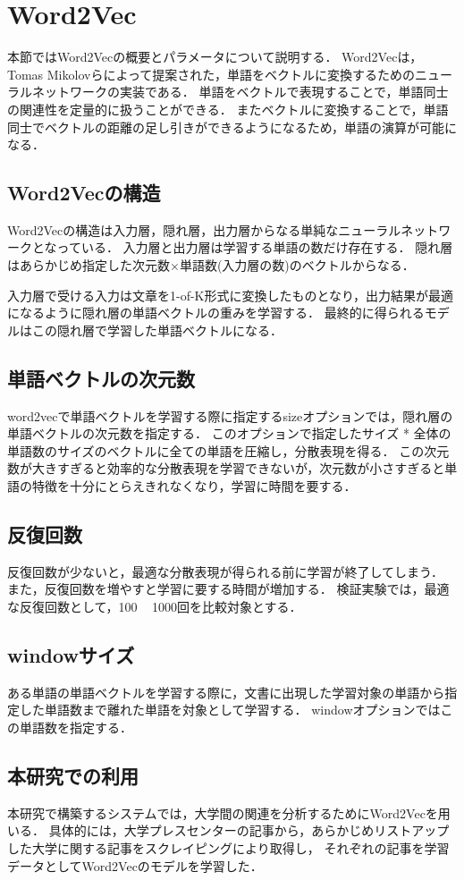 \section{Word2Vec}
本節ではWord2Vecの概要とパラメータについて説明する．
Word2Vec\cite{word2vecBook}は，Tomas Mikolovら\cite{word2vec}によって提案された，単語をベクトルに変換するためのニューラルネットワークの実装である．
単語をベクトルで表現することで，単語同士の関連性を定量的に扱うことができる．
またベクトルに変換することで，単語同士でベクトルの距離の足し引きができるようになるため，単語の演算が可能になる．

\subsection{Word2Vecの構造}
Word2Vecの構造は入力層，隠れ層，出力層からなる単純なニューラルネットワークとなっている．
入力層と出力層は学習する単語の数だけ存在する．
隠れ層はあらかじめ指定した次元数×単語数(入力層の数)のベクトルからなる．

入力層で受ける入力は文章を1-of-K形式に変換したものとなり，出力結果が最適になるように隠れ層の単語ベクトルの重みを学習する．
最終的に得られるモデルはこの隠れ層で学習した単語ベクトルになる．

\subsection{単語ベクトルの次元数}
word2vecで単語ベクトルを学習する際に指定するsizeオプションでは，隠れ層の単語ベクトルの次元数を指定する．
このオプションで指定したサイズ * 全体の単語数のサイズのベクトルに全ての単語を圧縮し，分散表現を得る．
この次元数が大きすぎると効率的な分散表現を学習できないが，次元数が小さすぎると単語の特徴を十分にとらえきれなくなり，学習に時間を要する．

\subsection{反復回数}
反復回数が少ないと，最適な分散表現が得られる前に学習が終了してしまう．
また，反復回数を増やすと学習に要する時間が増加する．
検証実験では，最適な反復回数として，100 ~ 1000回を比較対象とする．

\subsection{windowサイズ}
ある単語の単語ベクトルを学習する際に，文書に出現した学習対象の単語から指定した単語数まで離れた単語を対象として学習する．
windowオプションではこの単語数を指定する．


\subsection{本研究での利用}
本研究で構築するシステムでは，大学間の関連を分析するためにWord2Vecを用いる．
具体的には，大学プレスセンター\cite{pressCenter}の記事から，あらかじめリストアップした大学に関する記事をスクレイピングにより取得し，
それぞれの記事を学習データとしてWord2Vecのモデルを学習した．